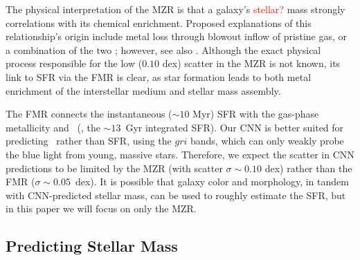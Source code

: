 \documentclass[fleqn,usenatbib]{mnras}
\newcommand{\editorial}[1]{\textcolor{red}{#1}}
\begin{document}
The physical interpretation of the MZR is that a galaxy's \editorial{stellar?} mass strongly correlations with its chemical enrichment. Proposed explanations of this relationship's origin include metal loss through blowout \citep[e.g.,][]{2002ApJ...581.1019G,Tremonti2004} inflow of pristine gas, or a combination of the two \citep[][]{2013ApJ...772..119L}; however, see also \cite{2013A&A...554A..58S}. Although the exact physical process responsible for the low ($0.10$ dex) scatter in the MZR is not known, its link to SFR via the FMR is clear, as star formation leads to both metal enrichment of the interstellar medium and stellar mass assembly.

The FMR connects the instantaneous ($\sim 10$ Myr) SFR with the gas-phase metallicity \citep[$\sim 1$~Gyr timescales; see, e.g.,][]{2011ApJ...734...48L} and \mstar\ (\ie, the $\sim 13$~Gyr integrated SFR). Our CNN is better suited for predicting \mstar\ rather than SFR, using the $gri$ bands, which can only weakly probe the blue light from young, massive stars. Therefore, we expect the scatter in CNN predictions to be limited by the MZR (with scatter $\sigma \sim 0.10$ dex) rather than the FMR ($\sigma \sim 0.05$~dex). It is possible that galaxy color and morphology, in tandem with CNN-predicted stellar mass, can be used to roughly estimate the SFR, but in this paper we will focus on only the MZR.


\subsection{Predicting Stellar Mass}
\end{document}
